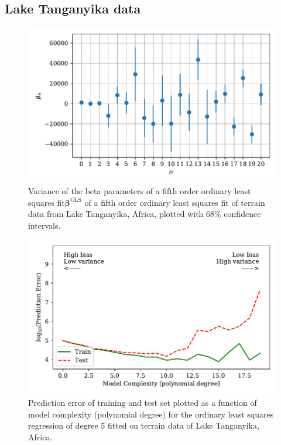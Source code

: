 \documentclass[a4paper, 10pt]{article}
\begin{document}
\subsection{Lake Tanganyika data}

\begin{figure}[H]
    \includegraphics[scale=1]{figs/beta_variance_ols_terrain.pdf}
    \caption{Variance of the beta parameters of a fifth order ordinary least squares fit$\bm{\beta}^{\text{OLS}}$  of a fifth order ordinary least squares fit of terrain data from Lake Tanganyika, Africa, plotted with $68\%$ confidence intervals.}
    \label{fig:beta_variance_terrain}
\end{figure}


\begin{figure}[H]
    \includegraphics[scale=1]{figs/biasvariancetradeoff_ols_terrain.pdf}
    \caption{Prediction error of training and test set plotted as a function of model complexity (polynomial degree) for the ordinary least squares regression of degree 5 fitted on terrain data of Lake Tanganyika, Africa.}
    \label{fig:bias_ols_terrain}
\end{figure}
\end{document}
